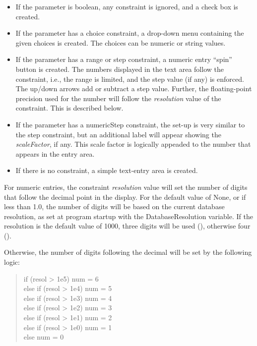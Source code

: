 \begin{itemize}
\item{If the parameter is boolean, any constraint is ignored, and a
check box is created.}

\item{If the parameter has a {\vt choice} constraint, a drop-down
menu containing the given choices is created.  The choices can be
numeric or string values.}

\item{If the parameter has a {\vt range} or {\vt step}
constraint, a numeric entry ``spin'' button is created.  The numbers
displayed in the text area follow the constraint, i.e., the range is
limited, and the step value (if any) is enforced.  The up/down arrows
add or subtract a step value.  Further, the floating-point precision
used for the number will follow the {\it resolution} value of the
constraint.  This is described below.}

\item{If the parameter has a {\vt numericStep} constraint, the
set-up is very similar to the {\vt step} constraint, but an additional
label will appear showing the {\it scaleFactor\/}, if any.  This scale
factor is logically appeaded to the number that appears in the entry
area.}

\item{If there is no constraint, a simple text-entry area is created.}
\end{itemize}

For numeric entries, the constraint {\it resolution} value will set
the number of digits that follow the decimal point in the display. 
For the default value of {\vt None}, or if less than 1.0, the number
of digits will be based on the current database resolution, as set at
program startup with the {\et DatabaseResolution} variable.  If the
resolution is the default value of 1000, three digits will be used
({}), otherwise four ({}).

Otherwise, the number of digits following the decimal will be set
by the following logic:
\begin{quote} \vt
    if (resol > 1e5)  num = 6\\
    else if (resol > 1e4)  num = 5\\
    else if (resol > 1e3)  num = 4\\
    else if (resol > 1e2)  num = 3\\
    else if (resol > 1e1)  num = 2\\
    else if (resol > 1e0)  num = 1\\
    else num = 0
\end{quote}

